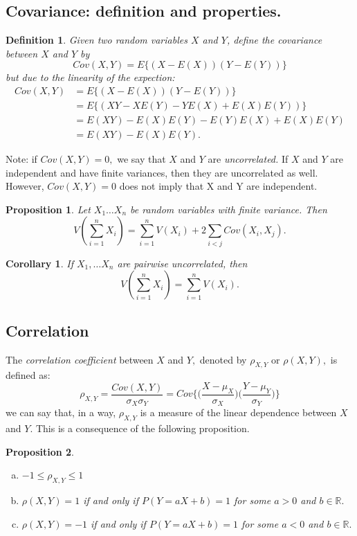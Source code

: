 \documentclass[12pt]{report} \addtolength{\textheight}{2in}
\newtheorem{cor}{Corollary}
\newtheorem{defn}{Definition}
\newtheorem{prop}{Proposition}
\newcommand{\Realnum}{\mathbb{R}}
\begin{document}
\subsection*{Covariance: definition and properties.}
\begin{defn}
Given two random variables $X$ and $Y$, define the covariance between $X$ and $Y$ by
\begin{displaymath}
Cov (X,Y) = E\{(X-E(X))(Y-E(Y))\}
\end{displaymath}
but due to the linearity of the expection:
\begin{align*}
Cov (X,Y) &= E\{(X-E(X))(Y-E(Y))\}\\
&=E\{(XY-XE(Y)-YE(X)+E(X)E(Y))\}\\
&=E(XY)-E(X)E(Y)-E(Y)E(X)+E(X)E(Y)\\
&=E(XY)-E(X)E(Y).
\end{align*}
\end{defn}
Note: if $Cov (X,Y)=0,$ we say that $X$ and $Y$ are \textit{uncorrelated.} If $X$ and $Y$ are independent and have finite variances, then they are uncorrelated as well. However, $Cov(X,Y)=0$ does not imply that X and Y are independent.
\begin{prop}
Let $X_1\dots X_n$ be random variables with finite variance. Then
\begin{displaymath}
V(\sum_{i=1}^{n}X_i)=\sum_{i=1}^{n}V(X_i) + 2\sum_{i < j} Cov(X_i,X_j).
\end{displaymath}
\end{prop}
\begin{cor}
If $X_1,\dots X_n$ are pairwise uncorrelated, then
\begin{displaymath}
V(\sum_{i=1}^{n}X_i)=\sum_{i=1}^{n}V(X_i).
\end{displaymath}
\end{cor}
\subsection*{Correlation}
The \textit{correlation coefficient} between $X$ and $Y,$ denoted by $\rho_{X,Y}$ or $\rho(X,Y),$ is defined as:
\begin{displaymath}
\rho_{X,Y}=\frac{Cov(X,Y)}{\sigma_X \sigma_Y}=Cov\Bigg\{\Bigg(\frac{X-\mu_X}{\sigma_X}\Bigg)\Bigg(\frac{Y-\mu_Y}{\sigma_Y}\Bigg)\Bigg\}
\end{displaymath} 
we can say that, in a way, $\rho_{X,Y}$ is a measure of the linear dependence between $X$ and $Y$. This is a consequence of the following proposition.
\begin{prop}
\begin{enumerate}[(a)]
\item $-1 \leq \rho_{X,Y} \leq 1 $
\item $\rho(X,Y) =1$ if and only if $P(Y=aX+b)=1$ for some $a > 0$ and $b \in \Realnum.$ 
\item $\rho(X,Y)=-1$ if and only if $P(Y =aX+b)=1$ for some $a < 0$ and $b \in \Realnum.$
\end{enumerate}
\end{prop}
\end{document}
